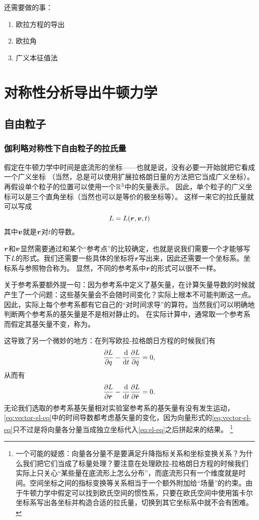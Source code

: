 还需要做的事：
\begin{enumerate}
    \item 欧拉方程的导出
    \item 欧拉角
    \item 广义本征值法
\end{enumerate}

\chapter{对称性分析导出牛顿力学}

\section{自由粒子}

\subsection{伽利略对称性下自由粒子的拉氏量}

假定在牛顿力学中时间是底流形的坐标——也就是说，没有必要一开始就把它看成一个广义坐标
（当然，总是可以使用扩展拉格朗日量的方法把它当成广义坐标）。
再假设单个粒子的位置可以使用一个$\mathbb{R}^3$中的矢量表示。
因此，单个粒子的广义坐标可以是三个直角坐标（当然也可以是等价的极坐标等）。
这样一来它的拉氏量就可以写成
\[
    L = L(\vb*{r}, \vb*{v}, t)
\]
其中$\vb*{v}$就是$\vb*{r}$对$t$的导数。

$\vb*{r}$和$\vb*{v}$显然需要通过和某个“参考点”的比较确定，也就是说我们需要一个才能够写下$L$的形式。我们还需要一些具体的坐标将$\vb*{r}$写出来，因此还需要一个坐标系。坐标系与参照物合称为。
显然，不同的参考系中$\vb*{r}$的形式可以很不一样。

关于参考系要额外提一句：因为参考系中定义了基矢量，在计算矢量导数的时候就产生了一个问题：这些基矢量会不会随时间变化？实际上根本不可能判断这一点。因此，实际上每个参考系都有它自己的“对时间求导”的算符。当然我们可以明确地判断两个参考系的基矢量是不是相对静止的。
在实际计算中，通常取一个参考系而假定其基矢量不变，称为。

这导致了另一个微妙的地方：在列写欧拉-拉格朗日方程的时候我们有
\begin{equation}
    \pdv{L}{q} - \dv{t} \pdv{L}{\dot{q}} = 0,
    \label{eq:el-eq}
\end{equation}
从而有
\begin{equation}
    \pdv{L}{\vb*{r}} - \dv{t} \pdv{L}{\dot{\vb*{r}}} = 0.
    \label{eq:vector-el-eq}
\end{equation}
无论我们选取的参考系基矢量相对实验室参考系的基矢量有没有发生运动，\eqref{eq:vector-el-eq}中的时间导数都考虑基矢量的变化，因为向量形式的\eqref{eq:vector-el-eq}只不过是将向量各分量当成独立坐标代入\eqref{eq:el-eq}之后拼起来的结果。%
\footnote{一个可能的疑惑：向量各分量不是要满足升降指标关系和坐标变换关系？为什么我们把它们当成了标量处理？要注意在处理欧拉-拉格朗日方程的时候我们实际上只关心“某些量在底流形上怎么分布”，而底流形只有一个维度就是时间。空间坐标之间的指标变换等关系相当于一个额外附加给“场量”的约束。由于牛顿力学中假定可以找到欧氏空间的惯性系，只要在欧氏空间中使用笛卡尔坐标系写出各坐标并构造合适的拉氏量，切换到其它坐标系中就不会有困难。}

